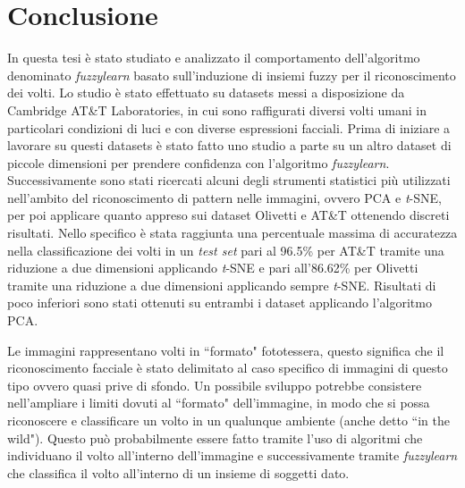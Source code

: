 \documentclass[12pt,italian]{report}
\begin{document}
\chapter*{Conclusione}
\label{cap:conclusioni}
In questa tesi è stato studiato e analizzato il comportamento dell'algoritmo denominato \emph{fuzzylearn} basato sull'induzione di insiemi fuzzy per il riconoscimento dei volti. Lo studio è stato effettuato su datasets messi a disposizione da Cambridge AT\&T Laboratories, in cui sono raffigurati diversi volti umani in particolari condizioni di luci e con diverse espressioni facciali. Prima di iniziare a lavorare su questi datasets è stato fatto uno studio a parte su un altro dataset di piccole dimensioni per prendere confidenza con l'algoritmo \emph{fuzzylearn}. Successivamente sono stati ricercati alcuni degli strumenti statistici più utilizzati nell'ambito del riconoscimento di pattern nelle immagini, ovvero PCA e \emph{t}-SNE, per poi applicare quanto appreso sui dataset Olivetti e AT\&T ottenendo discreti risultati. Nello specifico è stata raggiunta una percentuale massima di accuratezza nella classificazione dei volti in un \emph{test set} pari al 96.5\% per AT\&T tramite una riduzione a due dimensioni applicando \emph{t}-SNE e pari all'86.62\% per Olivetti tramite una riduzione a due dimensioni applicando sempre \emph{t}-SNE. Risultati di poco inferiori sono stati ottenuti su entrambi i dataset applicando l'algoritmo PCA.

Le immagini rappresentano volti in ``formato" fototessera, questo significa che il riconoscimento facciale è stato delimitato al caso specifico di immagini di questo tipo ovvero quasi prive di sfondo. Un possibile sviluppo potrebbe consistere nell'ampliare i limiti dovuti al ``formato" dell'immagine, in modo che si possa riconoscere e classificare un volto in un qualunque ambiente (anche detto ``in the wild"). Questo può probabilmente essere fatto tramite l'uso di algoritmi che individuano il volto all'interno dell'immagine e successivamente tramite \emph{fuzzylearn} che classifica il volto all'interno di un insieme di soggetti dato.
\end{document}
